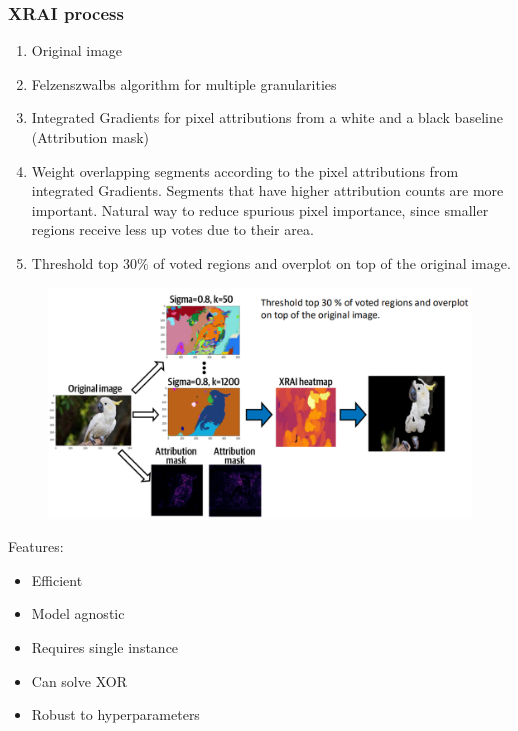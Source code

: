 \subsubsection{XRAI process}
\begin{enumerate}
    \item Original image
    \item Felzenszwalbs algorithm for multiple granularities
    \item Integrated Gradients for pixel attributions from a white and a black baseline (Attribution mask)
    \item Weight overlapping segments according to the pixel attributions from integrated Gradients. Segments that have higher attribution counts are more important. Natural way to reduce spurious pixel importance, since smaller regions receive less up votes due to their area.
    \item Threshold top 30\% of voted regions and overplot on top of the original image.
\end{enumerate}
\begin{figure}
    \includegraphics[width = \columnwidth]{figures/XAI2/XRAI.png}
\end{figure}
Features:
\begin{itemize}
    \item Efficient
    \item Model agnostic
    \item Requires single instance
    \item Can solve XOR
    \item Robust to hyperparameters 
\end{itemize}